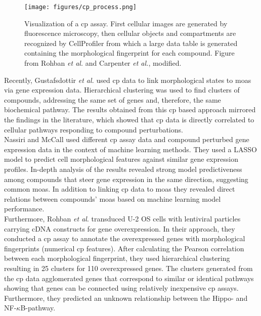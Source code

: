 \begin{figure}[H]
	\centering
	\texttt{[image: figures/cp\_process.png]}
	\caption[Visualization of a \ac{cp} Assay]{Visualization of a \ac{cp} assay. First cellular images are generated by fluorescence microscopy, then cellular objects and compartments are recognized by CellProfiler from which a large data table is generated containing the morphological fingerprint for each compound. Figure from Rohban \textit{et al.} and Carpenter \textit{et al.}, modified.\cite{Carpenter2006,Rohban2017}}
	\label{fig:cpprocess}
\end{figure}\noindent
Recently, Gustafsdottir \textit{et al.}\cite{Gustafsdottir2013} used \ac{cp} data to link morphological states to \acp{moa} via gene expression data. Hierarchical clustering was used to find clusters of compounds, addressing the same set of genes and, therefore, the same biochemical pathway. The results obtained from this \ac{cp} based approach mirrored the findings in the literature, which showed that \ac{cp} data is directly correlated to cellular pathways responding to compound perturbations.\\
Nassiri and McCall\cite{Nassiri2018} used different \ac{cp} assay data\cite{Wawer2014a} and compound perturbed gene expression data in the context of machine learning methods. They used a LASSO model to predict cell morphological features against similar gene expression profiles. In-depth analysis of the results revealed strong model predictiveness among compounds that steer gene expression in the same direction, suggesting common \acp{moa}. In addition to linking \ac{cp} data to \acp{moa} they revealed direct relations between compounds' \acp{moa} based on machine learning model performance.\\
Furthermore, Rohban \textit{et al}.\cite{Rohban2017} transduced U-2 OS cells with lentiviral particles carrying cDNA constructs for gene overexpression.\cite{Wiemann2016,Yang2011} In their approach, they conducted a \ac{cp} assay to annotate the overexpressed genes with morphological fingerprints (numerical \ac{cp} features). After calculating the Pearson correlation between each morphological fingerprint, they used hierarchical clustering resulting in \num{25} clusters for \num{110} overexpressed genes. The clusters generated from the \ac{cp} data agglomerated genes that correspond to similar or identical pathways showing that genes can be connected using relatively inexpensive \ac{cp} assays. Furthermore, they predicted an unknown relationship between the Hippo- and NF-$\kappa$B-pathway.\\
